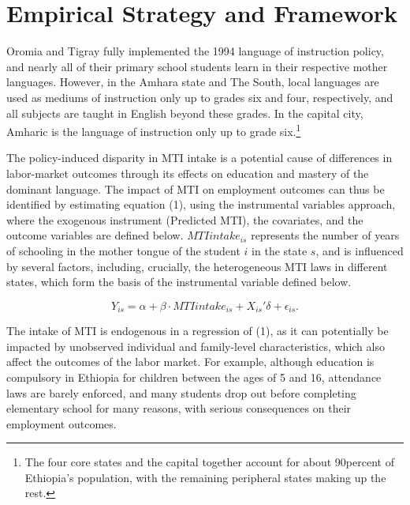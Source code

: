 
\section{Empirical Strategy and Framework }
\label{section:strategy}

Oromia and Tigray fully implemented the 1994 language of instruction policy, and nearly all of their primary school students learn in their respective mother languages. However, in the Amhara state and The South, local languages are used as mediums of instruction only up to grades six and four, respectively, and all subjects are taught in English beyond these grades. In the capital city, Amharic is the language of instruction only up to grade six.\footnote{The four core states and the capital together account for about 90percent of Ethiopia's population, with the remaining peripheral states making up the rest.} 

The policy-induced disparity in MTI intake is a potential cause of differences in labor-market outcomes through its effects on education and mastery of the dominant language. The impact of MTI on employment outcomes can thus be identified by estimating equation (1), using the instrumental variables approach, where the exogenous instrument (Predicted MTI), the covariates, and the outcome variables are defined below. $MTIintake_{is} $ represents the number of years of schooling in the mother tongue of the student $ i $ in the state $ s $, and is influenced by several factors, including, crucially, the heterogeneous MTI laws in different states, which form the basis of the instrumental variable defined below. 
 


\begin{equation}\label{eq:01}
	Y_{is} = \alpha + \beta\cdot MTIintake_{is} + X_{is}'\delta + \epsilon_{is}.
\end{equation}



The intake of MTI is endogenous in a regression of (1), as it can potentially be impacted by unobserved individual and family-level characteristics, which also affect the outcomes of the labor market. For example, although education is compulsory in Ethiopia for children between the ages of 5 and 16, attendance laws are barely enforced, and many students drop out before completing elementary school for many reasons, with serious consequences on their employment outcomes. 
 

